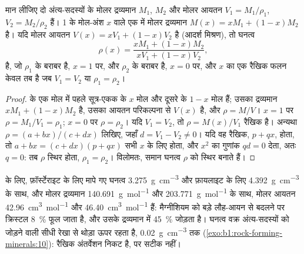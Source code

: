\begin{proposition}\label{prop:b1:rock-forming-minerals:ideal-mixing}
मान लीजिए दो अंत्य-सदस्यों के मोलर द्रव्यमान $M_1$, $M_2$ और मोलर आयतन $V_1 = M_1/\rho_1$, $V_2 = M_2/\rho_2$ हैं।
 1 के मोल-अंश $x$ वाले एक  में मोलर द्रव्यमान
$M(x) = x M_1 + (1 - x) M_2$ है। यदि मोलर आयतन $V(x) = x V_1 + (1 - x) V_2$ है (आदर्श मिश्रण), तो घनत्व
\[
  \rho(x) = \frac{x M_1 + (1 - x) M_2}{x V_1 + (1 - x) V_2},
\]
है, जो $\rho_1$ के बराबर है, $x = 1$ पर, और $\rho_2$ के बराबर है, $x = 0$ पर, और $x$ का एक रैखिक फलन केवल तब है जब
$V_1 = V_2$ या $\rho_1 = \rho_2$।
\end{proposition}

\begin{proof}
 के एक मोल में पहले सूत्र-एकक के $x$ मोल और दूसरे के $1 - x$ मोल हैं; उसका द्रव्यमान $x M_1 + (1 - x) M_2$
है, उसका आयतन परिकल्पना से $V(x)$ है, और $\rho = M/V$। $x = 1$ पर $\rho = M_1/V_1 = \rho_1$; $x = 0$ पर $\rho = \rho_2$।
यदि $V_1 = V_2$, तो $\rho = M(x)/V_1$ रैखिक है। अन्यथा $\rho = (a + bx)/(c + dx)$ लिखिए, जहाँ $d = V_1 - V_2 \ne 0$।
यदि वह रैखिक, $p + qx$, होता, तो $a + bx = (c + dx)(p + qx)$ सभी $x$ के लिए होता, और $x^2$ का गुणांक
$qd = 0$ देता, अतः $q = 0$: तब $\rho$ स्थिर होता, $\rho_1 = \rho_2$। विलोमतः, समान  घनत्व $\rho$ को
स्थिर बनाते हैं।
\end{proof}

 के लिए, फ़ॉर्स्टेराइट के लिए मापे गए घनत्व \qty{3.275}{g.cm^{-3}} और फ़ायलाइट के लिए \qty{4.392}{g.cm^{-3}} के साथ,
और मोलर द्रव्यमान \qty{140.691}{g.mol^{-1}} और \qty{203.771}{g.mol^{-1}} के साथ, मोलर आयतन
\qty{42.96}{cm^3.mol^{-1}} और \qty{46.40}{cm^3.mol^{-1}} हैं: मैग्नीशियम को बड़े लौह-आयन से बदलने पर क्रिस्टल
\qty{8}{\percent} फूल जाता है, और उसके द्रव्यमान में \qty{45}{\percent} जोड़ता है। घनत्व वक्र अंत्य-सदस्यों को जोड़ने
वाली सीधी रेखा से थोड़ा ऊपर रहता है, \qty{0.02}{g.cm^{-3}} तक
(\cref{exo:b1:rock-forming-minerals:10}): रैखिक अंतर्वेशन निकट है, पर सटीक नहीं।

